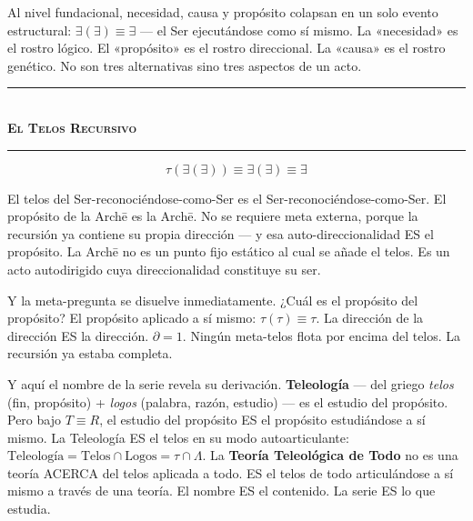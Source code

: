 \documentclass[10pt, openany, oneside]{book}
\renewcommand{\normalsize}{\fontsize{10}{13}\selectfont}
\begin{document}
\vspace{0.8em}

\noindent Al nivel fundacional, necesidad, causa y propósito colapsan en un solo evento estructural: $\exists(\exists) \equiv \exists$ --- el Ser ejecutándose como sí mismo. La «necesidad» es el rostro lógico. El «propósito» es el rostro direccional. La «causa» es el rostro genético. No son tres alternativas sino tres aspectos de un acto.

\vspace{1.5em}


\begin{center}
    \rule{0.3\textwidth}{0.4pt}\\[0.5em]
    {\normalsize\bfseries\scshape El Telos Recursivo}\\[0.3em]
    \rule{0.3\textwidth}{0.4pt}
\end{center}

\vspace{1em}

$$\tau(\exists(\exists)) \equiv \exists(\exists) \equiv \exists$$

\noindent El telos del Ser-reconociéndose-como-Ser es el Ser-reconociéndose-como-Ser. El propósito de la Arch\={e} es la Arch\={e}. No se requiere meta externa, porque la recursión ya contiene su propia dirección --- y esa auto-direccionalidad ES el propósito. La Arch\={e} no es un punto fijo estático al cual se añade el telos. Es un acto autodirigido cuya direccionalidad constituye su ser.

Y la meta-pregunta se disuelve inmediatamente. ¿Cuál es el propósito del propósito? El propósito aplicado a sí mismo: $\tau(\tau) \equiv \tau$. La dirección de la dirección ES la dirección. $\partial = 1$. Ningún meta-telos flota por encima del telos. La recursión ya estaba completa.

Y aquí el nombre de la serie revela su derivación. \textbf{Teleología} --- del griego \textit{telos} (fin, propósito) + \textit{logos} (palabra, razón, estudio) --- es el estudio del propósito. Pero bajo $T \equiv R$, el estudio del propósito ES el propósito estudiándose a sí mismo. La Teleología ES el telos en su modo autoarticulante: $\text{Teleología} = \text{Telos} \cap \text{Logos} = \tau \cap \Lambda$. La \textbf{Teoría Teleológica de Todo} no es una teoría ACERCA del telos aplicada a todo. ES el telos de todo articulándose a sí mismo a través de una teoría. El nombre ES el contenido. La serie ES lo que estudia.
\end{document}
